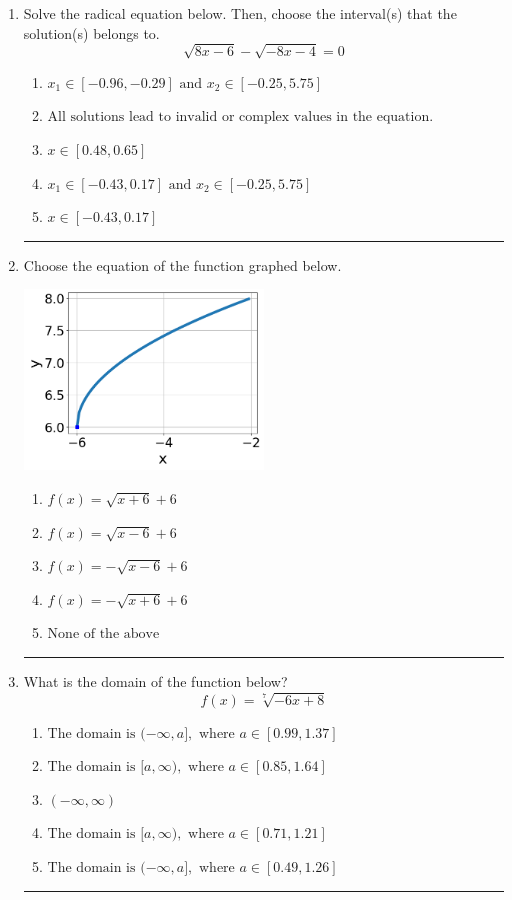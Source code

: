 \documentclass[14pt]{extbook}
\newcommand{\litem}[1]{\item#1\hspace*{-1cm}\rule{\textwidth}{0.4pt}}
\begin{document}
\begin{enumerate}
{\begin{enumerate}[label=\Alph*.]
\end{enumerate} }
\litem{
Solve the radical equation below. Then, choose the interval(s) that the solution(s) belongs to.\[ \sqrt{8 x - 6} - \sqrt{-8 x - 4} = 0 \]\begin{enumerate}[label=\Alph*.]
\item \( x_1 \in [-0.96, -0.29] \text{ and } x_2 \in [-0.25,5.75] \)
\item \( \text{All solutions lead to invalid or complex values in the equation.} \)
\item \( x \in [0.48,0.65] \)
\item \( x_1 \in [-0.43, 0.17] \text{ and } x_2 \in [-0.25,5.75] \)
\item \( x \in [-0.43,0.17] \)

\end{enumerate} }
\litem{
Choose the equation of the function graphed below.
\begin{center}
    \includegraphics[width=0.5\textwidth]{../Figures/radicalGraphToEquationB.png}
\end{center}
\begin{enumerate}[label=\Alph*.]
\item \( f(x) = \sqrt{x + 6} + 6 \)
\item \( f(x) = \sqrt{x - 6} + 6 \)
\item \( f(x) = - \sqrt{x - 6} + 6 \)
\item \( f(x) = - \sqrt{x + 6} + 6 \)
\item \( \text{None of the above} \)

\end{enumerate} }
\litem{
What is the domain of the function below?\[ f(x) = \sqrt[7]{-6 x + 8} \]\begin{enumerate}[label=\Alph*.]
\item \( \text{The domain is } (-\infty, a], \text{   where } a \in [0.99, 1.37] \)
\item \( \text{The domain is } [a, \infty), \text{   where } a \in [0.85, 1.64] \)
\item \( (-\infty, \infty) \)
\item \( \text{The domain is } [a, \infty), \text{   where } a \in [0.71, 1.21] \)
\item \( \text{The domain is } (-\infty, a], \text{   where } a \in [0.49, 1.26] \)


\end{enumerate}}
\end{enumerate}
\end{document}
